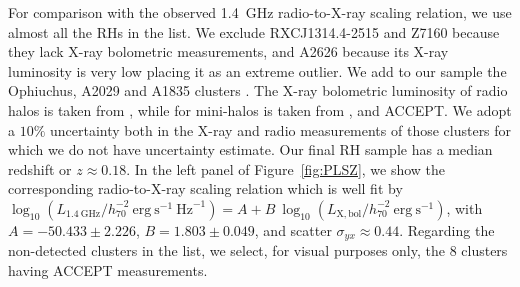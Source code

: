 \documentclass[traditabstract]{aa}
\newcommand{\rmn}{\mathrm}
\begin{document}
\begin{appendix}
For comparison with the observed 1.4~GHz radio-to-X-ray scaling relation, we use almost all the RHs in the \cite{2011A&A...527A..99E} list. We exclude RXCJ1314.4-2515 and Z7160 because they lack X-ray bolometric measurements, and A2626 because its X-ray luminosity is very low placing it as an extreme outlier. We add to our sample the Ophiuchus, A2029 and A1835 clusters \citep{2009A&A...499..371G}. The X-ray bolometric luminosity of radio halos is taken from \cite{2009A&A...507..661B}, while for mini-halos is taken from \cite{2002ApJ...567..716R}, \cite{Boehringer:1998vv} and ACCEPT. We adopt a $10\%$ uncertainty both in the X-ray and radio measurements of those clusters for which we do not have uncertainty estimate. Our final RH sample has a median redshift or $z\approx0.18$. In the left panel of Figure~\ref{fig:PLSZ}, we show the corresponding radio-to-X-ray scaling relation which is well fit by $\log_{10} (L_{1.4~\rmn{GHz}}/h_{70}^{-2}~\rmn{erg}~\rmn{s}^{-1}~\rmn{Hz}^{-1}) = A + B~\log_{10} (L_{ \rmn{X,bol}}/h_{70}^{-2}~\rmn{erg}~\rmn{s}^{-1})$, with $A=-50.433\pm2.226$, $B=1.803\pm0.049$, and scatter $\sigma_{yx} \approx 0.44$. Regarding the non-detected clusters in the \cite{2011A&A...527A..99E} list, we select, for visual purposes only, the 8 clusters having ACCEPT measurements. 


\end{appendix}
\end{document}
